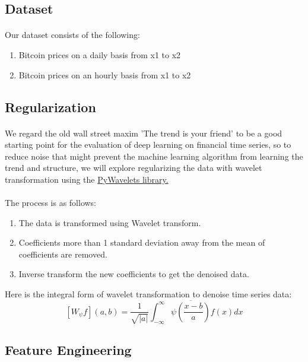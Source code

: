 \documentclass{article}
\begin{document}
\subsection{Dataset}
\paragraph{}
Our dataset consists of the following:
\begin{enumerate}
    \item Bitcoin prices on a daily basis from x1 to x2
    \item Bitcoin prices on an hourly basis from x1 to x2
\end{enumerate}

\subsection{Regularization}
\paragraph{}
We regard the old wall street maxim 'The trend is your friend' to be a good starting point for the evaluation of deep learning on financial time series, so to reduce noise that might prevent the machine learning algorithm from learning the trend and structure, we will explore regularizing the data with wavelet transformation using the \href{https://pywavelets.readthedocs.io/en/latest/#main-features}{PyWavelets library.}

\paragraph{}
The process is as follows:
\begin{enumerate}
\item The data is transformed using Wavelet transform.
\item Coefficients more than 1 standard deviation away from the mean of coefficients are removed.
\item Inverse transform the new coefficients to get the denoised data.
\end{enumerate}

\item Here is the integral form of wavelet transformation to denoise time series data:
\[\left[W_\psi f\right](a, b) = \frac{1}{\sqrt{|a|}} \int_{-\infty}^\infty \overline{\psi\left(\frac{x-b}{a}\right)}f(x)dx\]

\subsection{Feature Engineering}
\end{document}
